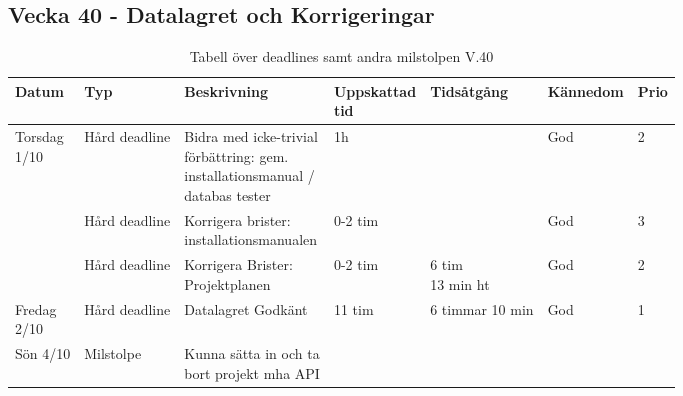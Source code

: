 \documentclass{TDP003mall}
\begin{document}
\subsection*{Vecka 40 - Datalagret och Korrigeringar}
\begin{table}[h!]
     \caption{Tabell över deadlines samt andra milstolpen V.40\label{tab:5}}  
\begin{tabularx}{\linewidth}{|l|l|X|l|l|l|l|}
  \hline
  Datum                          & Typ           & Beskrivning                                                                                        & \makecell[tl]{Uppskattad\\ tid} & Tidsåtgång                       & Kännedom & Prio \\ [0.5ex]
  \hline                                                      
  \makecell[tl]{Torsdag \\ 1/10} & Hård deadline & \makecell[tl]{Bidra med icke-trivial \\förbättring: gem. \\installationsmanual / \\databas tester} & 1h                              &                                  & God      & 2\\
  \hline                                                      
                                 & Hård deadline & \makecell[tl]{Korrigera brister: \\installationsmanualen}                                          & 0-2 tim                         &                                  & God      & 3 \\
  \hline                                                      
                                 & Hård deadline & \makecell[tl]{Korrigera Brister: \\Projektplanen}                                                  & 0-2 tim                         & \makecell[tl]{6 tim \\ 13 min ht} & God      & 2\\
  \hline
  \makecell[tl]{Fredag \\ 2/10}  & Hård deadline & Datalagret Godkänt                                                                                 & 11 tim                          &  6 timmar 10 min                                & God      & 1\\
  \hline
  Sön 4/10  & Milstolpe     & \makecell[tl]{Kunna sätta in och ta\\ bort projekt mha API}   &                &                       &          & \\
  \hline
\end{tabularx}   
    \end{table}
    
\end{document}
